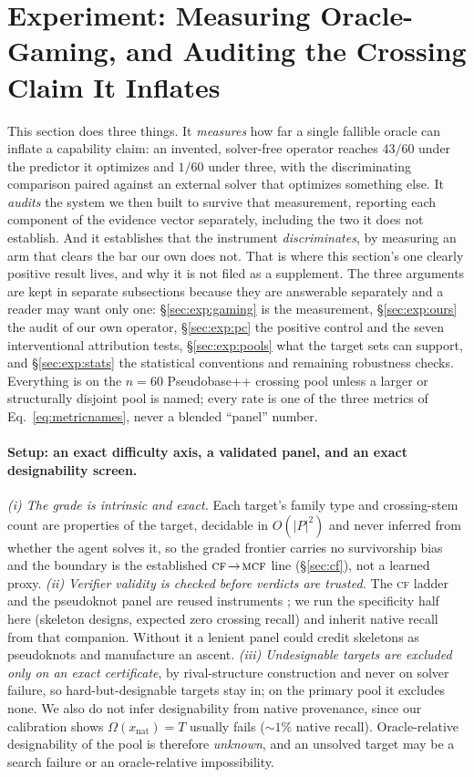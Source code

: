 \documentclass[11pt]{article}
\newcommand{\CF}{\textsc{cf}}
\newcommand{\MCF}{\textsc{mcf}}
\newcommand{\citecompanion}{\citep{verifiereconomicsanon}}
\newcommand{\citecompanion}{\citep{verifiereconomics}}
\begin{document}
\section{Experiment: Measuring Oracle-Gaming, and Auditing the Crossing Claim It Inflates}\label{sec:exp}
This section does three things. It \emph{measures} how far a single fallible oracle can inflate a capability
claim: an invented, solver-free operator reaches $43/60$ under the predictor it optimizes and $1/60$ under
three, with the discriminating comparison paired against an external solver that optimizes something else. It
\emph{audits} the system we then built to survive that measurement, reporting each component of the evidence
vector separately, including the two it does not establish. And it establishes that the instrument
\emph{discriminates}, by measuring an arm that clears the bar our own does not. That is where this section's
one clearly positive result lives, and why it is not filed as a supplement. The three arguments are kept in
separate subsections because they are answerable separately and a reader may want only one:
\S\ref{sec:exp:gaming} is the measurement, \S\ref{sec:exp:ours} the audit of our own operator,
\S\ref{sec:exp:pc} the positive control and the seven interventional attribution tests,
\S\ref{sec:exp:pools} what the target sets can support, and \S\ref{sec:exp:stats} the statistical
conventions and remaining robustness checks. Everything is on the $n{=}60$ Pseudobase++ crossing pool unless a larger or structurally disjoint
pool is named; every rate is one of the three metrics of Eq.~\eqref{eq:metricnames}, never a blended
``panel'' number.

\paragraph{Setup: an exact difficulty axis, a validated panel, and an exact designability screen.}
\emph{(i) The grade is intrinsic and exact.} Each target's family type and crossing-stem count are properties
of the target, decidable in $O(|P|^2)$ and never inferred from whether the agent solves it, so the graded
frontier carries no survivorship bias and the boundary is the established $\CF\!\to\!\MCF$ line
(\S\ref{sec:cf}), not a learned proxy. \emph{(ii) Verifier validity is checked before verdicts are trusted.}
The \CF{} ladder and the pseudoknot panel are reused instruments \citecompanion{}; we run the
specificity half here (skeleton designs, expected zero crossing recall) and inherit native recall from that
companion. Without it a lenient panel could credit skeletons as pseudoknots and manufacture an ascent.
\emph{(iii) Undesignable targets are excluded only on an exact certificate}, by rival-structure construction
\citep{zhou2024rigende,zhou2025motifs} and never on solver failure, so hard-but-designable targets stay in; on
the primary pool it excludes none. We also do not infer designability from native provenance, since our
calibration shows $\Omega(x_{\mathrm{nat}})=T$ usually fails ($\sim\!1\%$ native recall). Oracle-relative
designability of the pool is therefore \emph{unknown}, and an unsolved target may be a search failure or an
oracle-relative impossibility.
\end{document}
